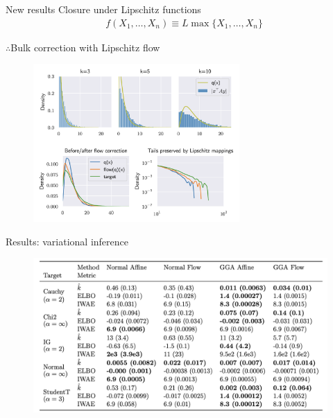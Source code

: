 \begin{frame}{New results}
    Closure under Lipschitz functions
    \begin{align*}
        & f(X_1,\dots,X_n) \equiv L \max\{X_1,\dots,X_n\}
    \end{align*}
    
    $\therefore$\quad Bulk correction with Lipschitz flow
    \begin{figure}
        \centering
        \includegraphics[width=0.7\textwidth]{Figures/gga/flow-correction.png}
    \end{figure}
\end{frame}

\begin{subframe}{Results: variational inference}
    \begin{figure}
        \centering
        \includegraphics[width=\textwidth]{Figures/gga/vi.png}
    \end{figure}
\end{subframe}

